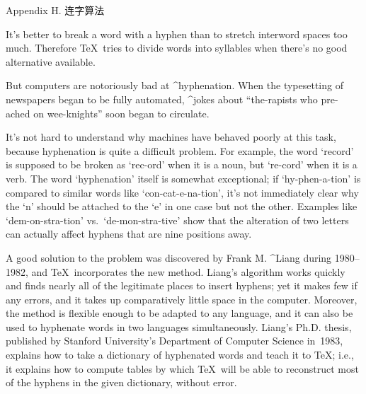 


\beginchapter Appendix H. 连字算法

It's better to break a word with a hyphen than to stretch interword spaces
too much. Therefore \TeX\ tries to divide words into syllables when
there's no good alternative available.

But computers are notoriously bad at ^{hyphenation}. When the type\-setting of
newspapers began to be fully automated, ^{jokes} about ``the-rapists who
pre-ached on wee-knights'' soon began to circulate.

It's not hard to understand why machines have behaved poorly at this task,
because hyphenation is quite a difficult problem. For example, the word
`record' is supposed to be broken as `rec-ord' when it is a noun, but
`re-cord' when it is a verb. The word `hyphenation' itself is somewhat
exceptional; if `hy-phen-a-tion' is compared to similar words like
`con-cat-e-na-tion', it's not immediately clear why the `n' should
be attached to the `e' in one case but not the other. Examples like
`dem-on-stra-tion' vs.~`de-mon-stra-tive' show that the alteration of
two letters can actually affect hyphens that are nine positions away.

A good solution to the problem was discovered by Frank M. ^{Liang} during
1980--1982, and \TeX\ incorporates the new method. Liang's algorithm
works quickly and finds nearly all of the legitimate places to insert
hyphens; yet it makes few if any errors, and it takes up comparatively
little space in the computer. Moreover, the method is flexible enough
to be adapted to any language, and it can also be used to hyphenate
words in two languages simultaneously. Liang's Ph.D. thesis,
published by Stanford University's Department of Computer Science in~1983,
explains how to take a dictionary of hyphenated words and teach it to \TeX;
i.e., it explains how to compute tables by which \TeX\ will be able to
reconstruct most of the hyphens in the given dictionary, without error.

